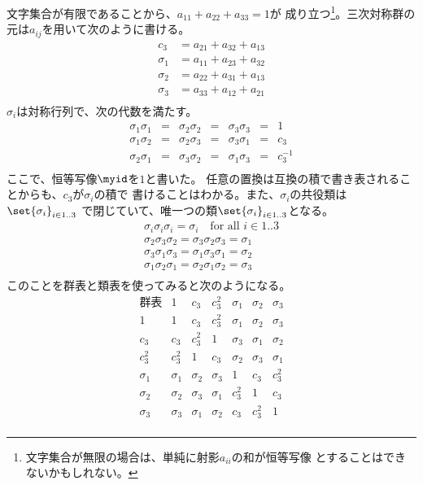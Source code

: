 	文字集合が有限であることから、$a_{11}+a_{22}+a_{33}=1$が
	成り立つ\footnote{
		文字集合が無限の場合は、単純に射影$a_{ii}$の和が恒等写像
		とすることはできないかもしれない。
	}。三次対称群の元は$a_{ij}$を用いて次のように書ける。
	\begin{equation*}\begin{split} %
		c_3 &= a_{21} + a_{32} + a_{13} \\
		\sigma_1 &= a_{11} + a_{23} + a_{32} \\
		\sigma_2 &= a_{22} + a_{31} + a_{13} \\
		\sigma_3 &= a_{33} + a_{12} + a_{21} \\
	\end{split}\end{equation*} %
	$\sigma_i$は対称行列で、次の代数を満たす。
	\begin{equation*}\begin{array}{ccccccc} %
		\sigma_1\sigma_1 &=& \sigma_2\sigma_2 &=& \sigma_3\sigma_3 &=& 1 \\
		\sigma_1\sigma_2 &=& \sigma_2\sigma_3 &=& \sigma_3\sigma_1 &=& c_3 \\
		\sigma_2\sigma_1 &=& \sigma_3\sigma_2 &=& \sigma_1\sigma_3 &=& c_3^{-1} \\
	\end{array}\end{equation*} %
	ここで、恒等写像$\myid$を$1$と書いた。
	任意の置換は互換の積で書き表されることからも、$c_3$が$\sigma_i$の積で
	書けることはわかる。また、$\sigma_i$の共役類は$\set{\sigma_i}_{i\in1..3}$
	で閉じていて、唯一つの類$\set{\sigma_i}_{i\in1..3}$となる。
	\begin{equation*}\begin{split} %
		\sigma_i\sigma_i\sigma_i = \sigma_i \quad\text{for all }i\in1..3 \\
		\sigma_2\sigma_3\sigma_2 = \sigma_3\sigma_2\sigma_3 = \sigma_1 \\
		\sigma_3\sigma_1\sigma_3 = \sigma_1\sigma_3\sigma_1 = \sigma_2 \\
		\sigma_1\sigma_2\sigma_1 = \sigma_2\sigma_1\sigma_2 = \sigma_3 \\
	\end{split}\end{equation*} %
	このことを群表と類表を使ってみると次のようになる。
	\begin{equation}\label{eq:三次対称群の群表}\begin{array}{c|ccccccc} %
		\text{群表} & 1 & c_3 & c_3^2 & \sigma_1 & \sigma_2 & \sigma_3 \\\hline
		1 & 1 & c_3 & c_3^2 & \sigma_1 & \sigma_2 & \sigma_3 \\
		c_3 & c_3 & c_3^2 & 1 & \sigma_3 & \sigma_1 & \sigma_2 \\
		c_3^2 & c_3^2 & 1 & c_3 & \sigma_2 & \sigma_3 & \sigma_1 \\
		\sigma_1 & \sigma_1 & \sigma_2 & \sigma_3 & 1 & c_3 & c_3^2 \\
		\sigma_2 & \sigma_2 & \sigma_3 & \sigma_1 & c_3^2 & 1 & c_3 \\
		\sigma_3 & \sigma_3 & \sigma_1 & \sigma_2 & c_3 & c_3^2 & 1 \\
	\end{array}\end{equation} %
